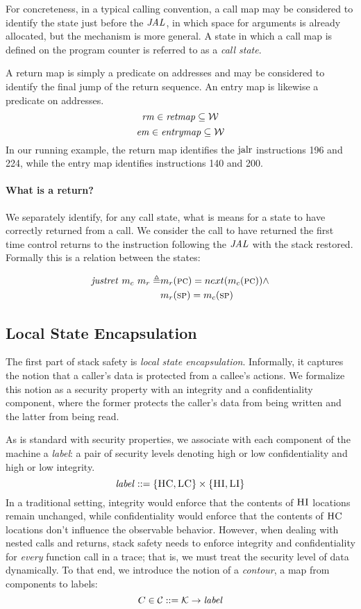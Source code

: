 \documentclass[acmsmall,review,anonymous]{acmart}\settopmatter{printfolios=true,printccs=false,printacmref=false}
\begin{document}
For concreteness, in a typical calling convention, a call map may be
considered to identify the state just before the \(\mathit{JAL}\), in which
space for arguments is already allocated, but the mechanism is more
general. A state in which a call map is defined on the program counter
is referred to as a {\it call state}.

A return map is simply a predicate on addresses and may be considered
to identify the final jump of the return sequence. An entry map is
likewise a predicate on addresses.
\[\mathit{rm} \in \mathit{retmap} \subseteq {\mathcal W}\]
\[\mathit{em} \in \mathit{entrymap} \subseteq {\mathcal W}\]
%
In our running example, the return map identifies the $\text{jalr}$
instructions 196 and 224, while the entry map identifies
instructions 140 and 200.

\paragraph*{What is a return?}

We separately identify, for any call state, what is means for a state
to have correctly returned from a call. We consider the call to have
returned the first time control returns to the instruction following
the \(\mathit{JAL}\) with the stack restored. Formally this is a relation
between the states:

\[\begin{split}
    \mathit{justret}\ m_c\ m_r \triangleq & m_r(\textsc{pc}) =
    next(m_c(\textsc{pc})) \land \\ & m_r(\textsc{sp}) = m_c(\textsc{sp})
\end{split}\]


\subsection{Local State Encapsulation}
\label{sec:lse}

The first part of stack safety is {\em local state encapsulation}.
Informally, it captures the notion that a caller's data is
protected from a callee's actions. We formalize this notion
as a security property with an integrity and a confidentiality
component, where the former protects the caller's data from being
written and the latter from being read.

As is standard with security properties, we associate with each
component of the machine a {\em label}: a pair of security levels
denoting high or low confidentiality and high or low integrity.
%
\[\mathit{label} ::= \{\textsc{HC},\textsc{LC}\} \times \{\textsc{HI},\textsc{LI}\}\]
%
In a traditional setting, integrity would enforce that the contents of
$\textsc{HI}$ locations remain unchanged, while confidentiality would
enforce that the contents of $\textsc{HC}$ locations don't influence the
observable behavior. However, when dealing with nested calls and
returns, stack safety needs to enforce integrity and confidentiality
for {\em every} function call in a trace; that is, we must treat the
security level of data dynamically.
%
To that end, we introduce the notion of a {\em contour}, a map from
components to labels:
%
\[C \in {\mathcal C} ::= {\mathcal K} \rightarrow \mathit{label}\]
\end{document}
